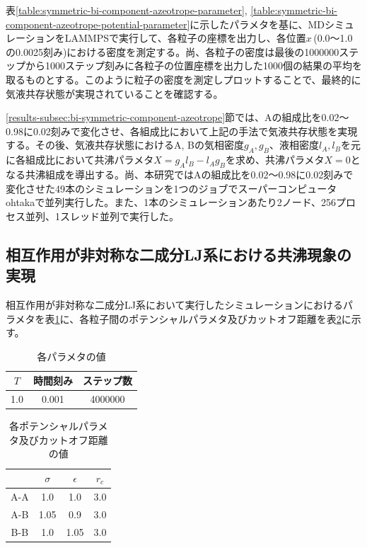 \documentclass[titlepage]{jsreport}
\begin{document}
\newpage
表\ref{table:symmetric-bi-component-azeotrope-parameter}, \ref{table:symmetric-bi-component-azeotrope-potential-parameter}に示したパラメタを基に、MDシミュレーションをLAMMPSで実行して、各粒子の座標を出力し、各位置$x$\,(0.0〜1.0の0.0025刻み)における密度を測定する。尚、各粒子の密度は最後の1000000ステップから1000ステップ刻みに各粒子の位置座標を出力した1000個の結果の平均を取るものとする。このように粒子の密度を測定しプロットすることで、最終的に気液共存状態が実現されていることを確認する。

\ref{results-subsec:bi-symmetric-component-azeotrope}節では、Aの組成比を0.02〜0.98に0.02刻みで変化させ、各組成比において上記の手法で気液共存状態を実現する。その後、気液共存状態におけるA, Bの気相密度$g_A, g_B$、液相密度$l_A, l_B$を元に各組成比において共沸パラメタ$X=g_Al_B-l_Ag_B$を求め、共沸パラメタ$X=0$となる共沸組成を導出する。尚、本研究ではAの組成比を0.02〜0.98に0.02刻みで変化させた49本のシミュレーションを1つのジョブでスーパーコンピュータohtakaで並列実行した。また、1本のシミュレーションあたり2ノード、256プロセス並列、1スレッド並列で実行した。


\subsection{相互作用が非対称な二成分LJ系における共沸現象の実現} \label{method-subsec:bi-asymmetric-component-azeotrope}
相互作用が非対称な二成分LJ系において実行したシミュレーションにおけるパラメタを表\ref{table:asymmetric-bi-component-azeotrope-parameter}に、各粒子間のポテンシャルパラメタ及びカットオフ距離を表\ref{table:asymmetric-bi-component-azeotrope-potential-parameter}に示す。

\begin{table}[htbp]
    \begin{center}
        \caption{各パラメタの値}
        \label{table:asymmetric-bi-component-azeotrope-parameter}
            \begin{tabular}{c c c}
                $T$ & 時間刻み & ステップ数 \\
                \hline
                1.0 & 0.001 & 4000000 \\
            \end{tabular}
    \end{center}
\end{table}

\begin{table}[htbp]
    \begin{center}
        \caption{各ポテンシャルパラメタ及びカットオフ距離の値}
        \label{table:asymmetric-bi-component-azeotrope-potential-parameter}
            \begin{tabular}{c | c c c}
                & $\sigma$ & $\epsilon$ & $r_c$ \\
                \hline
                A-A & 1.0 & 1.0 & 3.0 \\
                A-B & 1.05 & 0.9 & 3.0 \\
                B-B & 1.0 & 1.05 & 3.0
            \end{tabular}
    \end{center}
\end{table}
\end{document}
